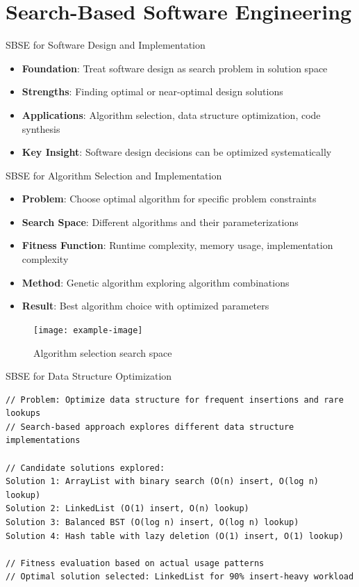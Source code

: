 \documentclass{beamer}
\begin{document}
\section{Search-Based Software Engineering}
\begin{frame}[t]{SBSE for Software Design and Implementation}
\begin{itemize}
\item \textbf{Foundation}: Treat software design as search problem in solution space
\item \textbf{Strengths}: Finding optimal or near-optimal design solutions
\item \textbf{Applications}: Algorithm selection, data structure optimization, code synthesis
\item \textbf{Key Insight}: Software design decisions can be optimized systematically
\end{itemize}
\end{frame}

\begin{frame}[t]{SBSE for Algorithm Selection and Implementation}
\begin{itemize}
\item \textbf{Problem}: Choose optimal algorithm for specific problem constraints
\item \textbf{Search Space}: Different algorithms and their parameterizations
\item \textbf{Fitness Function}: Runtime complexity, memory usage, implementation complexity
\item \textbf{Method}: Genetic algorithm exploring algorithm combinations
\item \textbf{Result}: Best algorithm choice with optimized parameters
\end{itemize}
\begin{figure}
\texttt{[image: example-image]}
\caption{Algorithm selection search space}
\end{figure}
\end{frame}

\begin{frame}[fragile,t]{SBSE for Data Structure Optimization}
\begin{verbatim}
// Problem: Optimize data structure for frequent insertions and rare lookups
// Search-based approach explores different data structure implementations

// Candidate solutions explored:
Solution 1: ArrayList with binary search (O(n) insert, O(log n) lookup)
Solution 2: LinkedList (O(1) insert, O(n) lookup)  
Solution 3: Balanced BST (O(log n) insert, O(log n) lookup)
Solution 4: Hash table with lazy deletion (O(1) insert, O(1) lookup)

// Fitness evaluation based on actual usage patterns
// Optimal solution selected: LinkedList for 90% insert-heavy workload
\end{verbatim}
\end{frame}
\end{document}
